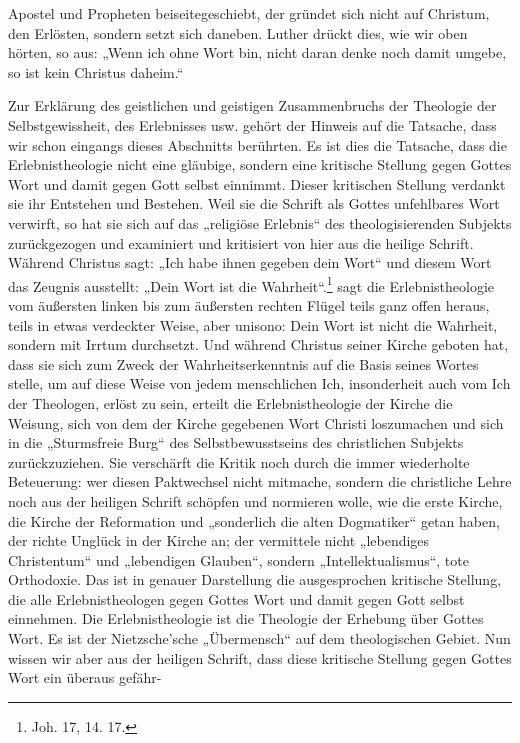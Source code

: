 \thispagestyle{plain}\setcounter{page}{141}\par Apostel und Propheten beiseitegeschiebt, der gründet sich nicht auf Christum, den Erlösten, sondern setzt sich daneben. Luther drückt dies, wie wir oben hörten, so aus: „Wenn ich ohne Wort bin, nicht daran denke noch damit umgebe, so ist kein Christus daheim.“\par Zur Erklärung des geistlichen und geistigen Zusammenbruchs der Theologie der Selbstgewissheit, des Erlebnisses usw. gehört der Hinweis auf die Tatsache, dass wir schon eingangs dieses Abschnitts berührten. Es ist dies die Tatsache, dass die Erlebnistheologie nicht eine gläubige, sondern eine kritische Stellung gegen Gottes Wort und damit gegen Gott selbst einnimmt. Dieser kritischen Stellung verdankt sie ihr Entstehen und Bestehen. Weil sie die Schrift als Gottes unfehlbares Wort verwirft, so hat sie sich auf das „religiöse Erlebnis“ des theologisierenden Subjekts zurückgezogen und examiniert und kritisiert von hier aus die heilige Schrift. Während Christus sagt: „Ich habe ihnen gegeben dein Wort“ und diesem Wort das Zeugnis ausstellt: „Dein Wort ist die Wahrheit“.\footnote{Joh. 17, 14. 17.} sagt die Erlebnistheologie vom äußersten linken bis zum äußersten rechten Flügel teils ganz offen heraus, teils in etwas verdeckter Weise, aber unisono: Dein Wort ist nicht die Wahrheit, sondern mit Irrtum durchsetzt. Und während Christus seiner Kirche geboten hat, dass sie sich zum Zweck der Wahrheitserkenntnis auf die Basis seines Wortes stelle, um auf diese Weise von jedem menschlichen Ich, insonderheit auch vom Ich der Theologen, erlöst zu sein, erteilt die Erlebnistheologie der Kirche die Weisung, sich von dem der Kirche gegebenen Wort Christi loszumachen und sich in die „Sturmsfreie Burg“ des Selbstbewusstseins des christlichen Subjekts zurückzuziehen. Sie verschärft die Kritik noch durch die immer wiederholte Beteuerung: wer diesen Paktwechsel nicht mitmache, sondern die christliche Lehre noch aus der heiligen Schrift schöpfen und normieren wolle, wie die erste Kirche, die Kirche der Reformation und „sonderlich die alten Dogmatiker“ getan haben, der richte Unglück in der Kirche an; der vermittele nicht „lebendiges Christentum“ und „lebendigen Glauben“, sondern „Intellektualismus“, tote Orthodoxie. Das ist in genauer Darstellung die ausgesprochen kritische Stellung, die alle Erlebnistheologen gegen Gottes Wort und damit gegen Gott selbst einnehmen. Die Erlebnistheologie ist die Theologie der Erhebung über Gottes Wort. Es ist der Nietzsche'sche „Übermensch“ auf dem theologischen Gebiet. Nun wissen wir aber aus der heiligen Schrift, dass diese kritische Stellung gegen Gottes Wort ein überaus gefähr-